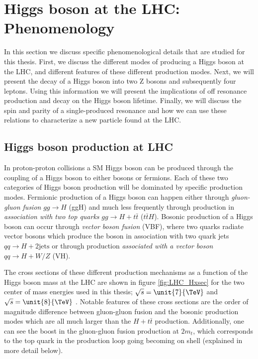 \chapter{Higgs boson at the LHC: Phenomenology}
\label{sec:LHC_Pheno}


In this section we discuss specific phenomenological details that are studied for this thesis. First, we discuss the different modes of producing a Higgs boson at the LHC, and different features of these different production modes. Next, we will present the decay of a Higgs boson into two Z bosons and subsequently four leptons. Using this information we will present the implications of off resonance production and decay on the Higgs boson lifetime. Finally, we will discuss the spin and parity of a single-produced resonance and how we can use these relations to characterize a new particle found at the LHC.

\section{Higgs boson production at LHC}
\label{sec:Higgs_Production_Pheno}

In proton-proton collisions a SM Higgs boson can be produced through the coupling of a Higgs boson to either bosons or fermions. Each of these two categories of Higgs boson production will be dominated by specific production modes. Fermionic production of a Higgs boson can happen either through \textit{gluon-gluon fusion} $gg \to H$ (ggH) and much less frequently through production in \textit{association with two top quarks} $gg \to H + t\bar{t}$ ($t\bar{t}H$). Bosonic production of a Higgs boson can occur through \textit{vector boson fusion} (VBF), where two quarks radiate vector bosons which produce the boson in association with two quark jets $qq \to H + 2\text{jets}$ or through production \textit{associated with a vector boson} $qq \to H + W/Z$ (VH).

The cross sections of these different production mechanisms as a function of the Higgs boson mass at the LHC are shown in figure \ref{fig:LHC_Hxsec} for the two center of mass energies used in this thesis; $\sqrt{s} = \unit{7}{\TeV}$ and $\sqrt{s} = \unit{8}{\TeV}$ \cite{Dittmaier:2011ti, Dittmaier:2012vm}. Notable features of these cross sections are the order of magnitude difference between gluon-gluon fusion and the bosonic production modes which are all much larger than the $H + t\bar{t}$ production. Additionally, one can see the boost in the gluon-gluon fusion production at $2m_{t}$, which corresponds to the top quark in the production loop going becoming on shell (explained in more detail below).

